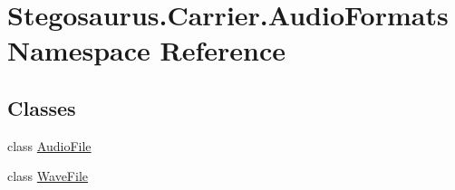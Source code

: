 \hypertarget{namespace_stegosaurus_1_1_carrier_1_1_audio_formats}{}\section{Stegosaurus.\+Carrier.\+Audio\+Formats Namespace Reference}
\label{namespace_stegosaurus_1_1_carrier_1_1_audio_formats}
\subsection*{Classes}
\begin{DoxyCompactItemize}
\item 
class \hyperlink{class_stegosaurus_1_1_carrier_1_1_audio_formats_1_1_audio_file}{Audio\+File}
\item 
class \hyperlink{class_stegosaurus_1_1_carrier_1_1_audio_formats_1_1_wave_file}{Wave\+File}
\end{DoxyCompactItemize}
